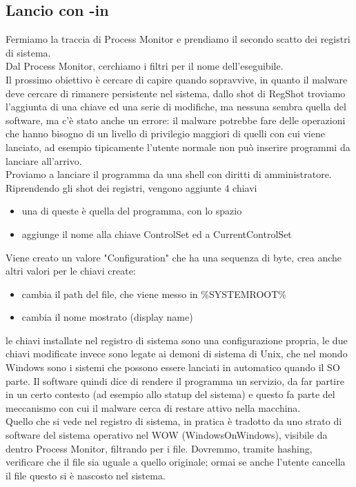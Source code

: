 \documentclass[12pt, oneside]{extbook}
\begin{document}
\subsection{Lancio con -in}
Fermiamo la traccia di Process Monitor e prendiamo il secondo scatto dei registri di sistema.\\Dal Process Monitor, cerchiamo i filtri per il nome dell'eseguibile.\\Il prossimo obiettivo è cercare di capire quando sopravvive, in quanto il malware deve cercare di rimanere persistente nel sistema, dallo shot di RegShot troviamo l'aggiunta di una chiave ed una serie di modifiche, ma nessuna sembra quella del software, ma c'è stato anche un errore: il malware potrebbe fare delle operazioni che hanno bisogno di un livello di privilegio maggiori di quelli con cui viene lanciato, ad esempio tipicamente l'utente normale non può inserire programmi da lanciare all'arrivo.\\Proviamo a lanciare il programma da una shell con diritti di amministratore.\\Riprendendo gli shot dei registri, vengono aggiunte 4 chiavi
\begin{itemize}
\item una di queste è quella del programma, con lo spazio
\item aggiunge il nome alla chiave ControlSet ed a CurrentControlSet
\end{itemize}
Viene creato un valore "Configuration" che ha una sequenza di byte, crea anche altri valori per le chiavi create:
\begin{itemize}
\item cambia il path del file, che viene messo in \%SYSTEMROOT\%
\item cambia il nome mostrato (display name)
\end{itemize}
le chiavi installate nel registro di sistema sono una configurazione propria, le due chiavi modificate invece sono legate ai demoni di sistema di Unix, che nel mondo Windows sono i sistemi che possono essere lanciati in automatico quando il SO parte. Il software quindi dice di rendere il programma un servizio, da far partire in un certo contesto (ad esempio allo statup del sistema) e questo fa parte del meccanismo con cui il malware cerca di restare attivo nella macchina.\\Quello che si vede nel registro di sistema, in pratica è tradotto da uno strato di software del sistema operativo nel WOW (WindowsOnWindows), visibile da dentro Process Monitor, filtrando per i file. Dovremmo, tramite hashing, verificare che il file sia uguale a quello originale; ormai se anche l'utente cancella il file questo si è nascosto nel sistema.
\end{document}
